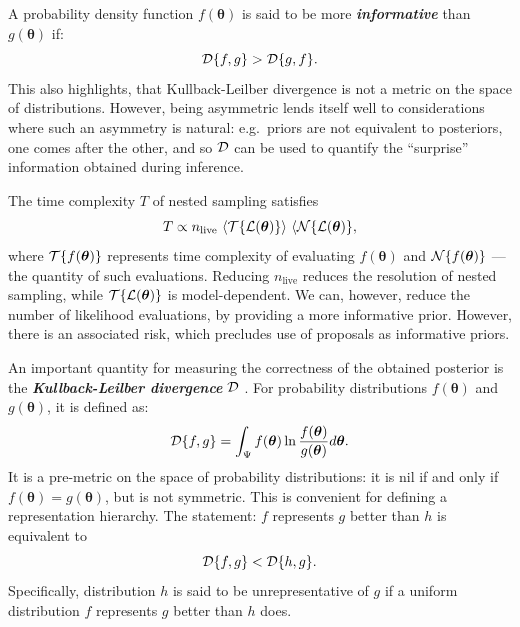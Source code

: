 \documentclass[usenatbib]{mnras}
\begin{document}
A probability density function \(f(\bm{\theta})\) is said to be more
\emph{\textbf{informative}} than \(g(\bm{\theta})\) if:
\begin{equation}
  \label{eq:informative}
  {\cal D}\{ f, g \} > {\cal D}\{ g, f\}.
\end{equation}
This also highlights, that Kullback-Leilber divergence is not a metric
on the space of distributions. However, being asymmetric lends itself
well to considerations where such an asymmetry is natural: e.g.~priors
are not equivalent to posteriors, one comes after the other, and so
${\cal D}$ can be used to quantify the ``surprise'' information
obtained during inference.

The time complexity $T$ of nested sampling satisfies
\begin{equation}\label{eq:complexity}
  T \propto  n_\text{live}\  \langle {\cal T}\{{\cal L}(\bm{\theta})\} \rangle \ \langle  {\cal N}\{{\cal L}(\bm{\theta}) \}, 
\end{equation}
where ${\cal T}\{f(\bm{\theta})\}$ represents time complexity of
evaluating $f(\bm{\theta})$ and ${\cal N}\{f(\bm{\theta})\}$ --- the
quantity of such evaluations. Reducing $n_\text{live}$ reduces the
resolution of nested sampling, while
$ {\cal T}\{{\cal L}(\bm{\theta})\}$ is model-dependent. We can,
however, reduce the number of likelihood evaluations, by providing a
more informative prior. However, there is an associated risk, which
precludes use of proposals as informative priors.

An important quantity for measuring the correctness of the obtained
posterior is the \textbf{\emph{Kullback-Leilber divergence}} ${\cal D}$
\citep{Kullback_1951}. For probability distributions
\(f(\bm{\theta})\) and \(g(\bm{\theta})\), it is defined as:
\begin{equation}
  \label{eq:kl-def}
  {\cal D}\{f, g \} = \int_{\Psi}f(\bm{\theta}) \ln \frac{f(\bm{\theta})}{g(\bm{\theta})} d \bm{\theta}.
\end{equation}
It is a pre-metric on the space of probability distributions: it is
nil if and only if $f(\bm{\theta}) = g(\bm{\theta})$, but is not
symmetric. This is convenient for defining a representation
hierarchy. The statement: $f$ represents $g$ better than $h$ is
equivalent to
\begin{equation}
  \label{eq:hierarchy}
  {\cal D}\{f, g\} < {\cal D}\{h, g\}.
\end{equation}
Specifically, distribution $h$ is said to be unrepresentative of $g$
if a uniform distribution $f$ represents $g$ better than $h$ does.
\end{document}

